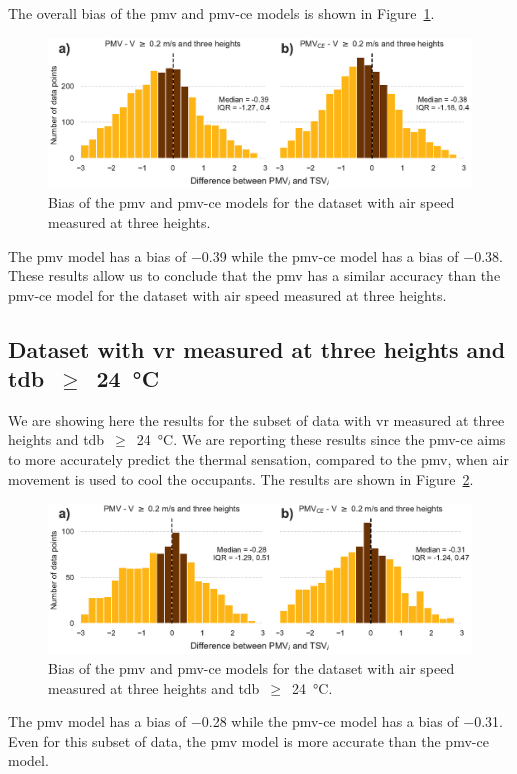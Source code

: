 The overall bias of the \ac{pmv} and \ac{pmv-ce} models is shown in Figure~\ref{fig:hist_discrepancies_three_heights}.
\begin{figure}[htb!]
    \centering
    \includegraphics[width=\textwidth]{figures/hist_discrepancies_three_heights}
    \caption{Bias of the \ac{pmv} and \ac{pmv-ce} models for the dataset with air speed measured at three heights.}
    \label{fig:hist_discrepancies_three_heights}
\end{figure}
The \ac{pmv} model has a bias of \num{-.39} while the \ac{pmv-ce} model has a bias of \num{-.38}.
These results allow us to conclude that the \ac{pmv} has a similar accuracy than the \ac{pmv-ce} model for the dataset with air speed measured at three heights.

\subsection{Dataset with \ac{vr} measured at three heights and \ac{tdb}~$\geq$~\qty{24}{\celsius}}\label{subsec:dataset-with-v-measured-at-three-heights-and-tdb-geq-24-celsius}
We are showing here the results for the subset of data with \ac{vr} measured at three heights and \ac{tdb}~$\geq$~\qty{24}{\celsius}.
We are reporting these results since the \ac{pmv-ce} aims to more accurately predict the thermal sensation, compared to the \ac{pmv}, when air movement is used to cool the occupants.
The results are shown in Figure~\ref{fig:hist_discrepancies_three_heights_limit_t}.
\begin{figure}[htb!]
    \centering
    \includegraphics[width=\textwidth]{figures/hist_discrepancies_three_heights_limit_t}
    \caption{Bias of the \ac{pmv} and \ac{pmv-ce} models for the dataset with air speed measured at three heights and \ac{tdb}~$\geq$~\qty{24}{\celsius}.}
    \label{fig:hist_discrepancies_three_heights_limit_t}
\end{figure}

The \ac{pmv} model has a bias of \num{-.28} while the \ac{pmv-ce} model has a bias of \num{-.31}.
Even for this subset of data, the \ac{pmv} model is more accurate than the \ac{pmv-ce} model.
